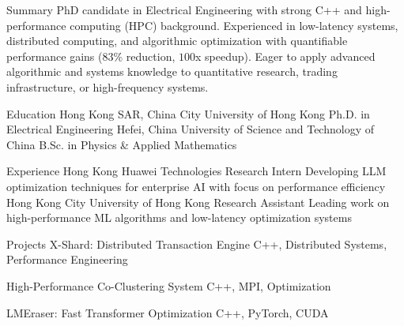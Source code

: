 \documentclass[caps, english]{financecv}
\begin{document}
\begin{cvsection}{Summary}
PhD candidate in Electrical Engineering with strong C++ and high-performance computing (HPC) background. Experienced in low-latency systems, distributed computing, and algorithmic optimization with quantifiable performance gains ($83\%$ reduction, $100$x speedup). Eager to apply advanced algorithmic and systems knowledge to quantitative research, trading infrastructure, or high-frequency systems.
\end{cvsection}

\begin{cvsection}{Education}
{Hong Kong SAR, China}
{City University of Hong Kong}
{Ph.D. in Electrical Engineering}
{}
{}
{}
{}
{Hefei, China}
{University of Science and Technology of China}
{B.Sc. in Physics \& Applied Mathematics}
{}
{}
{}
{}
\end{cvsection}

\begin{cvsection}{Experience}
{Hong Kong}
{Huawei Technologies}
{Research Intern}
{Developing LLM optimization techniques for enterprise AI with focus on performance efficiency}
{}
{}
{}
{Hong Kong}
{City University of Hong Kong}
{Research Assistant}
{Leading work on high-performance ML algorithms and low-latency optimization systems}
{}
{}
{}
\end{cvsection}

\begin{cvsection}{Projects}
{X-Shard: Distributed Transaction Engine}
{C++, Distributed Systems, Performance Engineering}
{}
{
}
{}

{High-Performance Co-Clustering System}
{C++, MPI, Optimization}
{}
{
}
{}

{LMEraser: Fast Transformer Optimization}
{C++, PyTorch, CUDA}
{}
{
}
{}
\end{cvsection}
\end{document}
